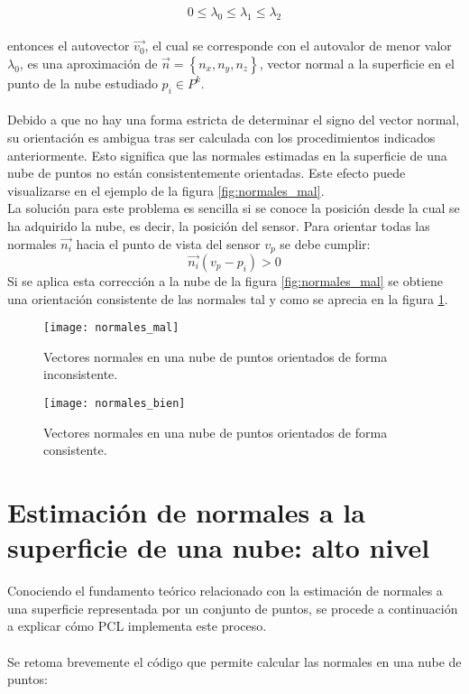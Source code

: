$$0\leq\lambda_0\leq\lambda_1\leq\lambda_2$$
\\
entonces el autovector $\vec{v_0}$, el cual se corresponde con el autovalor de menor valor $\lambda_0$, es una aproximación de $\vec{n}= \left\lbrace n_x,n_y,n_z\right\rbrace$, vector normal a la superficie en el punto de la nube estudiado $p_i \in P^k$.
\\
\\
Debido a que no hay una forma estricta de determinar el signo del vector normal, su orientación es ambigua tras ser calculada con los procedimientos indicados anteriormente. Esto significa que las normales estimadas en la superficie de una nube de puntos no están consistentemente orientadas. Este efecto puede visualizarse en el ejemplo de la figura \ref{fig:normales_mal}.
\\
La solución para este problema es sencilla si se conoce la posición desde la cual se ha adquirido la nube, es decir, la posición del sensor. Para orientar todas las normales $\vec{n_i}$ hacia el punto de vista del sensor $v_p$ se debe cumplir:
$$\vec{n_i}(v_p-p_i)>0$$
Si se aplica esta corrección a la nube de la figura \ref{fig:normales_mal} se obtiene una orientación consistente de las normales tal y como se aprecia en la figura \ref{fig:normales_bien}.

\begin{figure}[!htb]
  \texttt{[image: normales\_mal]}
  \caption{Vectores normales en una nube de puntos orientados de forma inconsistente.}\label{fig:normales_mal}
\endminipage\hfill
{}
  \texttt{[image: normales\_bien]}
  \caption{Vectores normales en una nube de puntos orientados de forma consistente.}\label{fig:normales_bien}
\endminipage\hfill
\end{figure}


\section{Estimación de normales a la superficie de una nube: alto nivel}
Conociendo el fundamento teórico relacionado con la estimación de normales a una superficie representada por un conjunto de puntos, se procede a continuación a explicar cómo PCL implementa este proceso.
\\
\\
Se retoma brevemente el código que permite calcular las normales en una nube de puntos:

